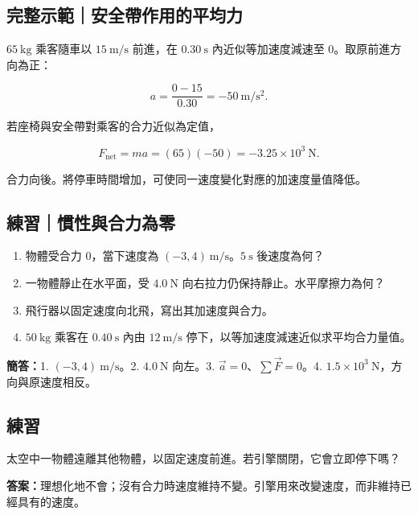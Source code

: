 \documentclass[11pt,a4paper]{article}
\providecommand{\tightlist}{%
  \setlength{\itemsep}{0pt}\setlength{\parskip}{0pt}}
\begin{document}
\begin{HandoutWorkedExample}

\subsection{完整示範｜安全帶作用的平均力}\label{ux5b8cux6574ux793aux7bc4ux5b89ux5168ux5e36ux4f5cux7528ux7684ux5e73ux5747ux529b}

\(65\ \mathrm{kg}\) 乘客隨車以 \(15\ \mathrm{m/s}\) 前進，在 \(0.30\ \mathrm s\) 內近似等加速度減速至 0。取原前進方向為正：

\[
a=\frac{0-15}{0.30}=-50\ \mathrm{m/s^2}.
\]

若座椅與安全帶對乘客的合力近似為定值，

\[
F_{\mathrm{net}}=ma=(65)(-50)=-3.25\times10^3\ \mathrm N.
\]

合力向後。將停車時間增加，可使同一速度變化對應的加速度量值降低。

\end{HandoutWorkedExample}

\begin{HandoutSelfCheck}

\subsection{練習｜慣性與合力為零}\label{ux7df4ux7fd2ux6163ux6027ux8207ux5408ux529bux70baux96f6}

\begin{enumerate}
\def\labelenumi{\arabic{enumi}.}
\tightlist
\item
  物體受合力 0，當下速度為 \((-3,4)\ \mathrm{m/s}\)。\(5\ \mathrm s\) 後速度為何？
\item
  一物體靜止在水平面，受 \(4.0\ \mathrm N\) 向右拉力仍保持靜止。水平摩擦力為何？
\item
  飛行器以固定速度向北飛，寫出其加速度與合力。
\item
  \(50\ \mathrm{kg}\) 乘客在 \(0.40\ \mathrm s\) 內由 \(12\ \mathrm{m/s}\) 停下，以等加速度減速近似求平均合力量值。
\end{enumerate}

\textbf{簡答：}1. \((-3,4)\ \mathrm{m/s}\)。2. \(4.0\ \mathrm N\) 向左。3. \(\vec a=0\)、\(\sum\vec F=0\)。4. \(1.5\times10^3\ \mathrm N\)，方向與原速度相反。

\end{HandoutSelfCheck}

\begin{HandoutSelfCheck}

\subsection{練習}\label{ux7df4ux7fd2-2}

太空中一物體遠離其他物體，以固定速度前進。若引擎關閉，它會立即停下嗎？

\textbf{答案：}理想化地不會；沒有合力時速度維持不變。引擎用來改變速度，而非維持已經具有的速度。

\end{HandoutSelfCheck}
\end{document}
